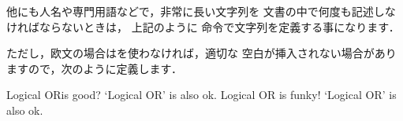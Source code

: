 他にも人名や専門用語などで，非常に長い文字列を
文書の中で何度も記述しなければならないときは，
上記のように  命令で文字列を定義する事になります．

ただし，欧文の場合はを使わなければ，適切な
空白が挿入されない場合がありますので，次のように定義します．
\begin{Syntax}
\texttt\lb{}\texttt\rb
\end{Syntax}

\begin{InOut}
\usepackage{xspace} 
\newcommand*\LC{Logical OR}%
\LC is good?  `\LC' is also ok.
\renewcommand*\LC{Logical OR\xspace}
\LC is funky! `\LC' is also ok.
\end{InOut}


%
%

%
%
%



